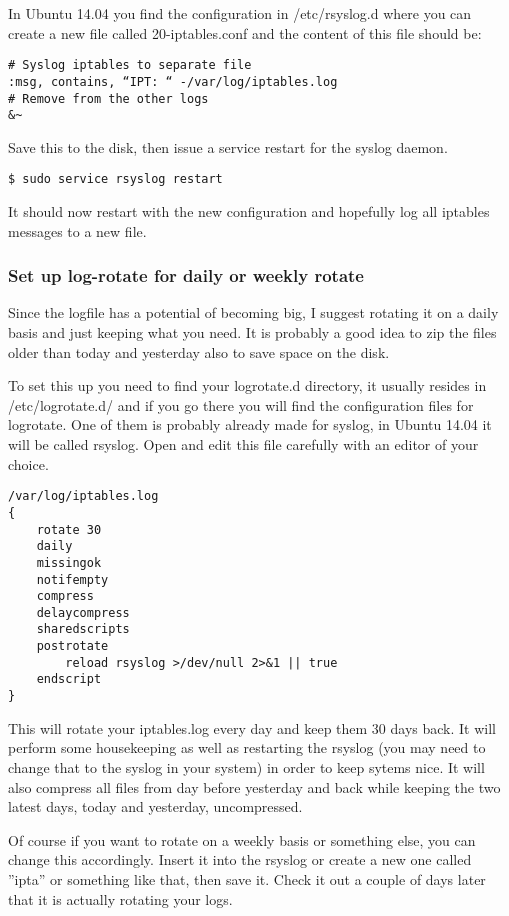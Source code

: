 \documentclass[english,twoside,openright,a4paper,12pt]{article}
\begin{document}
In Ubuntu 14.04 you find the configuration in /etc/rsyslog.d where 
you can create a new file called 20-iptables.conf and the content of 
this file should be:

\begin{verbatim}
# Syslog iptables to separate file
:msg, contains, “IPT: “ -/var/log/iptables.log 
# Remove from the other logs
&~
\end{verbatim}

Save this to the disk, then issue a service restart for the syslog 
daemon.

\begin{verbatim}
$ sudo service rsyslog restart
\end{verbatim}

It should now restart with the new configuration and hopefully log all iptables messages to a new file.

\subsubsection{Set up log-rotate for daily or weekly rotate}

Since the logfile has a potential of becoming big, I suggest rotating it on a daily basis and just keeping what you need. It is probably a good idea to zip the files older than today and yesterday also to save space on the disk.

To set this up you need to find your logrotate.d directory, it usually resides in /etc/logrotate.d/ and if you go there you will find the configuration files for logrotate. One of them is probably already made for syslog, in Ubuntu 14.04 it will be called rsyslog. Open and edit this file carefully with an editor of your choice.

\begin{verbatim}
/var/log/iptables.log
{
    rotate 30
    daily 
    missingok 
    notifempty 
    compress 
    delaycompress 
    sharedscripts 
    postrotate 
        reload rsyslog >/dev/null 2>&1 || true 
    endscript
}
\end{verbatim}

This will rotate your iptables.log every day and keep them 30 days back. It will perform some housekeeping as well as restarting the rsyslog (you may need to change that to the syslog in your system) in order to keep sytems nice. It will also compress all files from day before yesterday and back while keeping the two latest days, today and yesterday, uncompressed.

Of course if you want to rotate on a weekly basis or something else, you can change this accordingly. Insert it into the rsyslog or create a new one called ''ipta'' or something like that, then save it. Check it out a couple of days later that it is actually rotating your logs.
\end{document}
